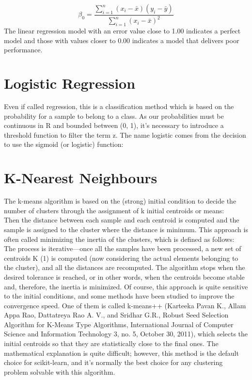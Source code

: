 \documentclass[12pt]{article}
\begin{document}
$$
\beta_{0} = \frac{\sum_{i=1}^{n} ( x_{i}-\bar{x}) (y_{i}-\bar{y})}{\sum_{i=1}^{n} ( x_{i}-\bar{x})^{2} }
$$
The linear regression model with an error value close to 1.00 indicates a perfect model and those with values closer to 0.00 indicates a model that delivers poor performance.

\newpage
\section{Logistic Regression}
Even if called regression, this is a classification method which is based on the probability for
a sample to belong to a class. As our probabilities must be continuous in R and bounded
between (0, 1), it's necessary to introduce a threshold function to filter the term z. The name
logistic comes from the decision to use the sigmoid (or logistic) function:

\newpage
\section{K-Nearest Neighbours}
The k-means algorithm is based on the (strong) initial condition to decide the number of
clusters through the assignment of k initial centroids or means:
\\
Then the distance between each sample and each centroid is computed and the sample is
assigned to the cluster where the distance is minimum. This approach is often called
minimizing the inertia of the clusters, which is defined as follows:
\\
The process is iterative—once all the samples have been processed, a new set of centroids
K (1) is computed (now considering the actual elements belonging to the cluster), and all the
distances are recomputed. The algorithm stops when the desired tolerance is reached, or in
other words, when the centroids become stable and, therefore, the inertia is minimized.
Of course, this approach is quite sensitive to the initial conditions, and some methods have
been studied to improve the convergence speed. One of them is called k-means++ (Karteeka
Pavan K., Allam Appa Rao, Dattatreya Rao A. V., and Sridhar G.R., Robust Seed Selection
Algorithm for K-Means Type Algorithms, International Journal of Computer Science and
Information Technology 3, no. 5, October 30, 2011), which selects the initial centroids so that
they are statistically close to the final ones. The mathematical explanation is quite difficult;
however, this method is the default choice for scikit-learn, and it's normally the best choice
for any clustering problem solvable with this algorithm.
\end{document}

